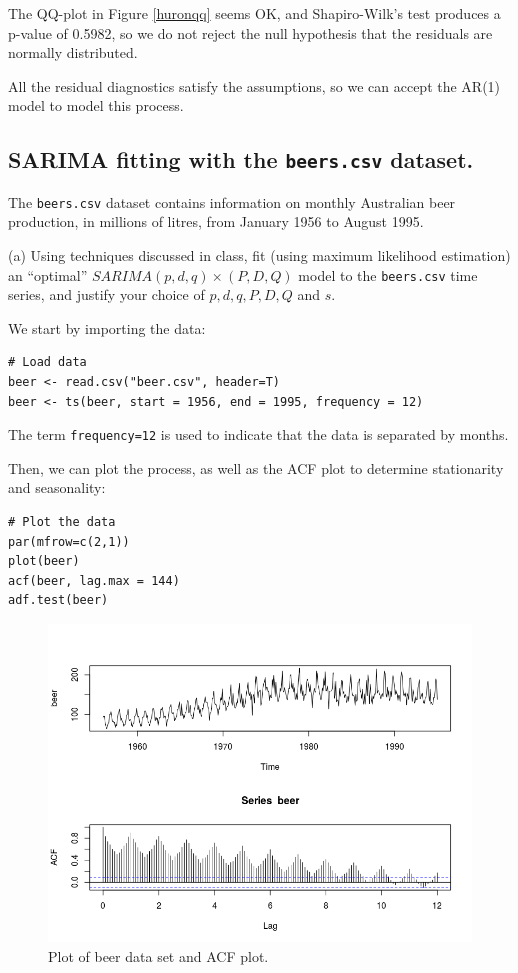 \documentclass[]{article}
\begin{document}
The QQ-plot in Figure \ref{huronqq} seems OK, and Shapiro-Wilk's test produces a p-value of 0.5982, so we do not reject the null hypothesis that the residuals are normally distributed.

All the residual diagnostics satisfy the assumptions, so we can accept the AR(1) model to model this process.
\color{black}

\newpage
\subsection{SARIMA fitting with the \texttt{beers.csv} dataset.}
The \texttt{beers.csv} dataset contains information on monthly Australian beer production,
in millions of litres, from January 1956 to August 1995.

(a) Using techniques discussed in class, fit (using maximum likelihood estimation) an “optimal” $SARIMA(p,d,q) \times (P,D,Q)$ model to the \texttt{beers.csv} time series, and justify your choice of $p, d, q, P, D, Q$ and $s$.

\color{blue}
We start by importing the data:
\begin{Verbatim}[frame=single]
# Load data
beer <- read.csv("beer.csv", header=T)
beer <- ts(beer, start = 1956, end = 1995, frequency = 12)
\end{Verbatim}
The term \texttt{frequency=12} is used to indicate that the data is separated by months.

Then, we can plot the process, as well as the ACF plot to determine stationarity and seasonality:
\begin{Verbatim}[frame=single]
# Plot the data
par(mfrow=c(2,1))
plot(beer)
acf(beer, lag.max = 144)
adf.test(beer)
\end{Verbatim}

\begin{figure}[!ht]
\centering
\includegraphics[width=.8\textwidth]{beer.png}
\caption{Plot of beer data set and ACF plot.}
\label{beer}
\end{figure}
\end{document}
